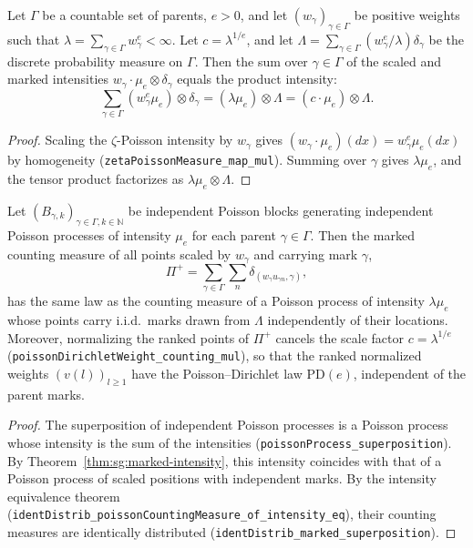 \begin{theorem}\label{thm:sg:marked-intensity}
  \leanok
Let $\Gamma$ be a countable set of parents, $e > 0$, and let $(w_\gamma)_{\gamma \in \Gamma}$ be positive weights such that $\lambda = \sum_{\gamma \in \Gamma} w_\gamma^e < \infty$.
Let $c = \lambda^{1/e}$, and let $\Lambda = \sum_{\gamma \in \Gamma} (w_\gamma^e / \lambda) \delta_\gamma$ be the discrete probability measure on $\Gamma$.
Then the sum over $\gamma \in \Gamma$ of the scaled and marked intensities $w_\gamma \cdot \mu_e \otimes \delta_\gamma$ equals the product intensity:
\[
 \sum_{\gamma \in \Gamma} (w_\gamma^e \mu_e) \otimes \delta_\gamma = (\lambda \mu_e) \otimes \Lambda = (c \cdot \mu_e) \otimes \Lambda .
\]
\end{theorem}
\begin{proof}
  \leanok
Scaling the $\zeta$-Poisson intensity by $w_\gamma$ gives $(w_\gamma \cdot \mu_e)(dx) = w_\gamma^e \mu_e(dx)$ by homogeneity (\texttt{zetaPoissonMeasure\_map\_mul}). Summing over $\gamma$ gives $\lambda \mu_e$, and the tensor product factorizes as $\lambda \mu_e \otimes \Lambda$.
\end{proof}

\begin{theorem}\label{thm:sg:marked-superposition}
  \leanok
Let $(B_{\gamma, k})_{\gamma \in \Gamma, k \in \mathbb N}$ be independent Poisson blocks generating independent Poisson processes of intensity $\mu_e$ for each parent $\gamma \in \Gamma$.
Then the marked counting measure of all points scaled by $w_\gamma$ and carrying mark $\gamma$,
\[
 \Pi^+ = \sum_{\gamma \in \Gamma} \sum_{n} \delta_{(w_\gamma u_{\gamma n}, \gamma)} ,
\]
has the same law as the counting measure of a Poisson process of intensity $\lambda \mu_e$ whose points carry i.i.d.\ marks drawn from $\Lambda$ independently of their locations.
Moreover, normalizing the ranked points of $\Pi^+$ cancels the scale factor $c = \lambda^{1/e}$ (\texttt{poissonDirichletWeight\_counting\_mul}), so that the ranked normalized weights $(v(l))_{l \ge 1}$ have the Poisson--Dirichlet law $\mathrm{PD}(e)$, independent of the parent marks.
\end{theorem}
\begin{proof}
  \leanok
The superposition of independent Poisson processes is a Poisson process whose intensity is the sum of the intensities (\texttt{poissonProcess\_superposition}). By Theorem~\ref{thm:sg:marked-intensity}, this intensity coincides with that of a Poisson process of scaled positions with independent marks. By the intensity equivalence theorem (\texttt{identDistrib\_poissonCountingMeasure\_of\_intensity\_eq}), their counting measures are identically distributed (\texttt{identDistrib\_marked\_superposition}).
\end{proof}

